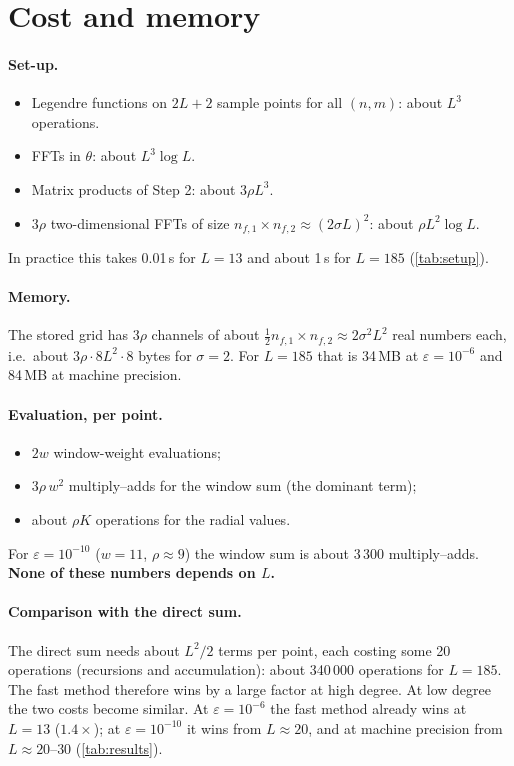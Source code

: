 \documentclass[11pt,a4paper]{article}
\theoremstyle{definition}
\newcommand{\eps}{\varepsilon}
\begin{document}


\section{Cost and memory}\label{sec:cost}

\paragraph{Set-up.}
\begin{itemize}
\item Legendre functions on $2L+2$ sample points for all $(n,m)$: about $L^3$ operations.
\item FFTs in $\theta$: about $L^3\log L$.
\item Matrix products of Step 2: about $3\rho L^3$.
\item $3\rho$ two-dimensional FFTs of size $n_{f,1}\times n_{f,2}\approx(2\sigma L)^2$: about $\rho L^2\log L$.
\end{itemize}
In practice this takes 0.01\,s for $L=13$ and about 1\,s for $L=185$ (\cref{tab:setup}).

\paragraph{Memory.} The stored grid has $3\rho$ channels of about $\tfrac12n_{f,1}\times n_{f,2}\approx2\sigma^2L^2$ real numbers each,
i.e.\ about $3\rho\cdot8L^2\cdot8$ bytes for $\sigma=2$. For $L=185$ that is 34\,MB at $\eps=10^{-6}$ and 84\,MB at machine precision.

\paragraph{Evaluation, per point.}
\begin{itemize}
\item $2w$ window-weight evaluations;
\item $3\rho\,w^2$ multiply--adds for the window sum (the dominant term);
\item about $\rho K$ operations for the radial values.
\end{itemize}
For $\eps=10^{-10}$ ($w=11$, $\rho\approx9$) the window sum is about 3\,300 multiply--adds. \textbf{None of these numbers depends on $L$.}

\paragraph{Comparison with the direct sum.} The direct sum needs about $L^2/2$ terms per point, each costing some 20 operations
(recursions and accumulation): about 340\,000 operations for $L=185$. The fast method therefore wins by a large factor at high
degree. At low degree the two costs become similar. At $\eps=10^{-6}$ the fast method already wins at $L=13$ ($1.4\times$); at $\eps=10^{-10}$ it wins from
$L\approx20$, and at machine precision from $L\approx20$--$30$ (\cref{tab:results}).
\end{document}
